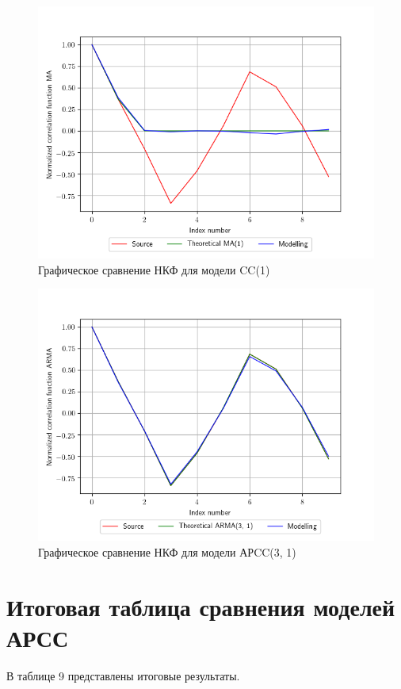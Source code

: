 \documentclass[12pt, fleqn]{article}
\begin{document}
{{		\begin{figure}[H]
			\includegraphics{plot_ma_ncf.png}
			\caption{Графическое сравнение НКФ для модели CC(1)}
		\end{figure}
		  	
		\begin{figure}[H]
			\includegraphics{plot_arma_ncf.png}
			\caption{Графическое сравнение НКФ для модели АРCC(3, 1)}
		\end{figure}
	} 
				
	\newpage
	\section{Итоговая таблица сравнения моделей АРСС}
	{
		В таблице 9 представлены итоговые результаты.
			  
}}
\end{document}
